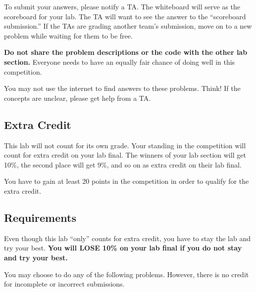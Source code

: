 \documentclass[11pt]{cselabheader}
\theoremstyle{plain}
\begin{document}

To submit your answers, please notify a TA. The whiteboard will serve as the
scoreboard for your lab. The TA will want to see the answer to the ``scoreboard
submission.'' If the TAs are grading another team's submission,  move on to a
new problem while waiting for them to be free.

\textbf{Do not share the problem descriptions or the code with the other lab
section.} Everyone needs to have an equally fair chance of doing well in this
competition.

You may not use the internet to find answers to these problems. Think! If the
concepts are unclear, please get help from a TA.

\subsection{Extra Credit}
This lab will not count for its own grade. Your standing in the competition 
will count for extra credit on your lab final.
The winners of your lab section will get 10\%, the second place will get
9\%, and so on as extra credit on their lab final. 

You have to gain at least 20 points in the competition in order to qualify
for the extra credit.

\subsection{Requirements}
Even though this lab ``only'' counts for extra credit, you have to stay the lab
and try your best. \textbf{You will LOSE 10\% on your lab final if you do not
stay and try your best.}

You may choose to do any of the following problems. However, there is no credit
for incomplete or incorrect submissions.

\end{document}
